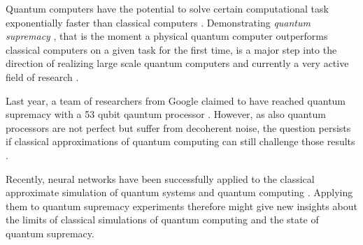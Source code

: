 Quantum computers have the potential to solve certain computational task exponentially faster
than classical computers \cite{feynman1999simulating,shor1999polynomial}. Demonstrating \textit{quantum supremacy} 
\cite{preskill2012quantum}, that is the moment a physical quantum computer outperforms classical 
computers on a given task for the first time, is a major step into the direction of realizing 
large scale quantum computers and currently a very active field of research \cite{google2019supremacy, Neill_2018, aaronson2016complexitytheoretic, boul2018quantum, aaronson2010computational, boixo2018characterizing}.

Last year, a team of researchers from Google claimed to have reached quantum supremacy with a 53 qubit
qauntum processor \cite{google2019supremacy}. However, as also quantum processors are not perfect but suffer from decoherent noise, the 
question persists if classical approximations of quantum computing can still challenge those results \cite{zhou2020limits}. 

Recently, neural networks have been successfully applied to the classical approximate simulation of quantum systems and
quantum computing \cite{Carleo_2017,jnsson2018neuralnetwork}. Applying them to quantum supremacy experiments therefore might give new insights about the
limits of classical simulations of quantum computing and the state of quantum supremacy.

